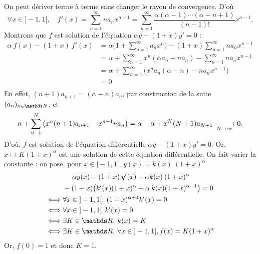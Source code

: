 \begin{exm}
\begin{enumerate}
			On peut dériver terme à terme sans changer le rayon de convergence. D'où 
			\[
				\forall x \in {]-1,1[},\quad f'(x) = \sum_{n=1}^\infty n a_n x^{n-1} = \sum_{n=1}^\infty \frac{\alpha (\alpha - 1)\cdots (\alpha - n + 1)}{(n-1)!} x^{n-1}
			.\] Montrons que $f$\/ est solution de l'équation $\alpha y - (1+x) y' = 0$ :
			\begin{align*}
				\alpha\: f(x) - (1+x)\: f'(x)
				&= \alpha \Big(1 + \sum_{n=1}^\infty a_n x^n\Big) - (1+x) \sum_{n=1}^\infty n a_n x^{n-1} \\
				&= \alpha + \sum_{n=1}^\infty x^n (\alpha a_n - n a_n) - \sum_{n=1}^\infty n a_n x^{n-1}  \\
				&= \alpha + \sum_{n=1}^\infty \big(x^n a_n (\alpha - n) - n a_n x^{n-1}\big) \\
				&= 0 \\
			\end{align*}
			En effet, $(n+1) a_{n+1} = (\alpha - n) a_n$, par construction de la suite $(a_n)_{n\in\N}$, et \[
				\alpha + \sum_{n=1}^N \big(x^n (n+1) a_{n+1} - x^{n+1} n a_n\big)
				= \alpha - \alpha + x^N (N+1) a_{N+1} \xrightarrow[N\to \infty]{} 0
			.\]
			D'où, $f$\/ est solution de l'équation différentielle $\alpha y - (1+x) y' = 0$. Or, $x \mapsto K (1+x)^\alpha$\/ est une solution de cette équation différentielle. On fait varier la constante : on pose, pour $x \in {]-1,1[}$, $y(x) = k(x)\: (1+x)^\alpha$\/
			\begin{align*}
				&\mathrel{\phantom-}\alpha y(x) - (1+x)\: y'(x) - \alpha k(x)\: (1+x)^\alpha\\
				&- (1+x)\big(k'(x) (1+x)^\alpha + \alpha\:k(x)(1+x)^{\alpha - 1}\big) = 0\\
				\iff& \forall x \in{]-1,1[},\:(1+x)^{\alpha + 1} k'(x) = 0\\
				\iff& \forall x \in {]-1,1[}, k'(x) = 0 \\
				\iff&  \exists K \in \R,\: k(x) = K \\
				\iff& \exists K \in \R,\:\forall x \in {]-1,1[}, f(x) = K (1+x)^\alpha \\
			\end{align*}
			Or, $f(0) = 1$\/ et donc $K = 1$.
	\end{enumerate}
\end{exm}

